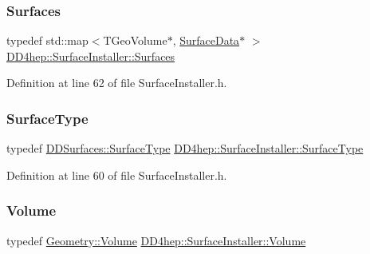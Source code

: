\subsubsection{\texorpdfstring{Surfaces}{Surfaces}}
{\footnotesize\ttfamily typedef std\+::map$<$T\+Geo\+Volume$\ast$, \hyperlink{class_d_d4hep_1_1_surface_installer_adf9b9c7ac69d57dd6e262891e925be3c}{Surface\+Data}$\ast$ $>$ \hyperlink{class_d_d4hep_1_1_surface_installer_a16346209b86955ff4a4a380c3ce1bcd2}{D\+D4hep\+::\+Surface\+Installer\+::\+Surfaces}\hspace{0.3cm}{\ttfamily [protected]}}



Definition at line 62 of file Surface\+Installer.\+h.

\hypertarget{class_d_d4hep_1_1_surface_installer_a8989d1da18081ccd8afbe70a21d0c918}{}\label{class_d_d4hep_1_1_surface_installer_a8989d1da18081ccd8afbe70a21d0c918} 
\subsubsection{\texorpdfstring{Surface\+Type}{SurfaceType}}
{\footnotesize\ttfamily typedef \hyperlink{class_d_d_surfaces_1_1_surface_type}{D\+D\+Surfaces\+::\+Surface\+Type} \hyperlink{class_d_d4hep_1_1_surface_installer_a8989d1da18081ccd8afbe70a21d0c918}{D\+D4hep\+::\+Surface\+Installer\+::\+Surface\+Type}\hspace{0.3cm}{\ttfamily [protected]}}



Definition at line 60 of file Surface\+Installer.\+h.

\hypertarget{class_d_d4hep_1_1_surface_installer_a32a727cbf3cfca5204b7eaf344a5304f}{}\label{class_d_d4hep_1_1_surface_installer_a32a727cbf3cfca5204b7eaf344a5304f} 
\subsubsection{\texorpdfstring{Volume}{Volume}}
{\footnotesize\ttfamily typedef \hyperlink{class_d_d4hep_1_1_geometry_1_1_volume}{Geometry\+::\+Volume} \hyperlink{class_d_d4hep_1_1_surface_installer_a32a727cbf3cfca5204b7eaf344a5304f}{D\+D4hep\+::\+Surface\+Installer\+::\+Volume}\hspace{0.3cm}{\ttfamily [protected]}}



